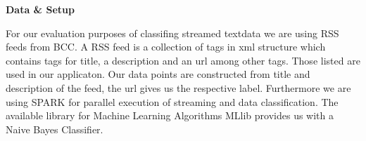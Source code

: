 \begin{center} \textbf{\huge Data \& Setup} \end{center}
For our evaluation purposes of classifing streamed textdata we are using RSS feeds from BCC. A RSS feed is a collection of tags in xml structure which contains tags for title, a description and an url among other tags. Those listed are used in our applicaton. Our data points are constructed from title and description of the feed, the url gives us the respective label. Furthermore we are using SPARK for parallel execution of streaming and data classification. The available library for Machine Learning Algorithms MLlib provides us with a Naive Bayes Classifier.
  


